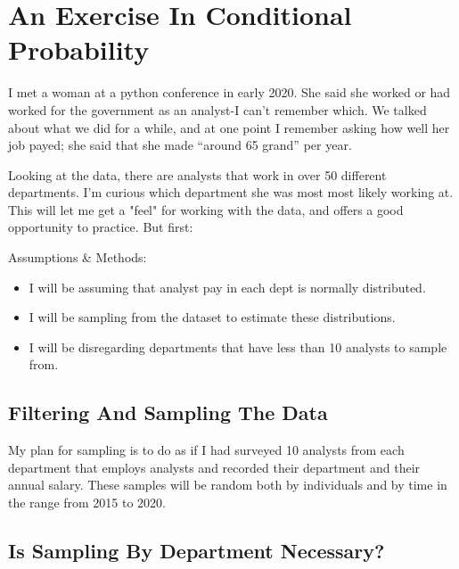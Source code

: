 \documentclass[letterpaper]{article}
\theoremstyle{definition}
\begin{document}
    

\hypertarget{getting-my-feet-wet-creeping-on-people-i-met-once}{ 
	\section{An Exercise In Conditional Probability}
	\label{getting-my-feet-wet-creeping-on-people-i-met-once}}

I met a woman at a python conference in early 2020. She said she worked
or had worked for the government as an analyst-I can't remember which.
We talked about what we did for a while, and at one point I remember asking how well her job
payed; she said that she made ``around 65 grand'' per year.

Looking at the data, there are analysts that work in over 50 different departments. I'm
curious which department she was most most likely working at. This will let me get a
"feel" for working with the data, and offers a good opportunity to practice. But first:

\large{Assumptions \& Methods:}
\begin{itemize}
\item
	I will be assuming that analyst pay in each dept is normally distributed.
\item
	I will be sampling from the dataset to estimate these distributions.
\item
	I will be disregarding departments that have less than 10 analysts to sample from.
\end{itemize}

    \hypertarget{step-1-filter-the-data}{%
\subsection{Filtering And Sampling The Data}\label{step-1-filter-the-data}}

My plan for sampling is to do as if I had surveyed 10 analysts from each department
that employs analysts  and recorded their department and their annual salary. These
samples will be random both by individuals and by time in the range from 2015 to 2020. 


    \hypertarget{step-2-see-if-theres-even-a-difference-between-the-average-salaries-in-each-department}{%
\subsection{Is Sampling By Department Necessary?}\label{step-2-see-if-theres-even-a-difference-between-the-average-salaries-in-each-department}}
\end{document}
